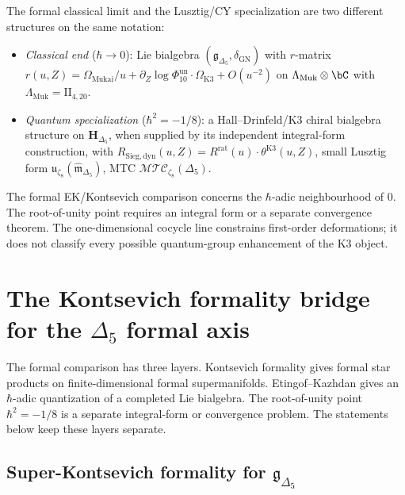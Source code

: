 \begin{remark}
\label{rem:defq-synthesis}
The formal classical limit and the Lusztig/CY specialization are two
different structures on the same notation:
\begin{itemize}
 \item \emph{Classical end} ($\hbar \to 0$): Lie bialgebra
 $(\mathfrak g_{\Delta_5}, \delta_{\mathrm{GN}})$ with $r$-matrix
 $r(u, Z) = \Omega_{\mathrm{Mukai}}/u + \partial_Z\log\Phi_{10}^{\mathrm{un}}
 \cdot\Omega_{\mathrm{K3}} + O(u^{-2})$ on
 $\Lambda_{\mathrm{Muk}}\otimes\bC$ with
 $\Lambda_{\mathrm{Muk}} = \mathrm{II}_{4,20}$.
 \item \emph{Quantum specialization} ($\hbar^2 = -1/8$): a
 Hall--Drinfeld/K3 chiral bialgebra structure on
 $\mathbf H_{\Delta_5}$, when supplied by its independent integral-form
 construction, with
 $R_{\mathrm{Sieg,dyn}}(u, Z)=R^{\mathrm{rat}}(u)\cdot\theta^{\mathrm{K3}}(u, Z)$,
 small Lusztig form
 $\mathfrak u_{\zeta_8}(\widehat{\mathfrak m}_{\Delta_5})$,
 MTC $\mathcal{MTC}_{\zeta_8}(\Delta_5)$.
\end{itemize}
The formal EK/Kontsevich comparison concerns the \(\hbar\)-adic
neighbourhood of \(0\). The root-of-unity point requires an integral
form or a separate convergence theorem. The one-dimensional cocycle
line constrains first-order deformations; it does not classify every
possible quantum-group enhancement of the K3 object.
\end{remark}

\section{The Kontsevich formality bridge for the \texorpdfstring{$\Delta_5$}{Delta5} formal axis}
\label{sec:defq-kontsevich-formality-bridge}

The formal comparison has three layers. Kontsevich formality gives
formal star products on finite-dimensional formal supermanifolds.
Etingof--Kazhdan gives an \(\hbar\)-adic quantization of a completed
Lie bialgebra. The root-of-unity point \(\hbar^2=-1/8\) is a separate
integral-form or convergence problem. The statements below keep these
layers separate.

\subsection{Super-Kontsevich formality for $\mathfrak g_{\Delta_5}$}
\label{subsec:defq-super-kontsevich-formality}

